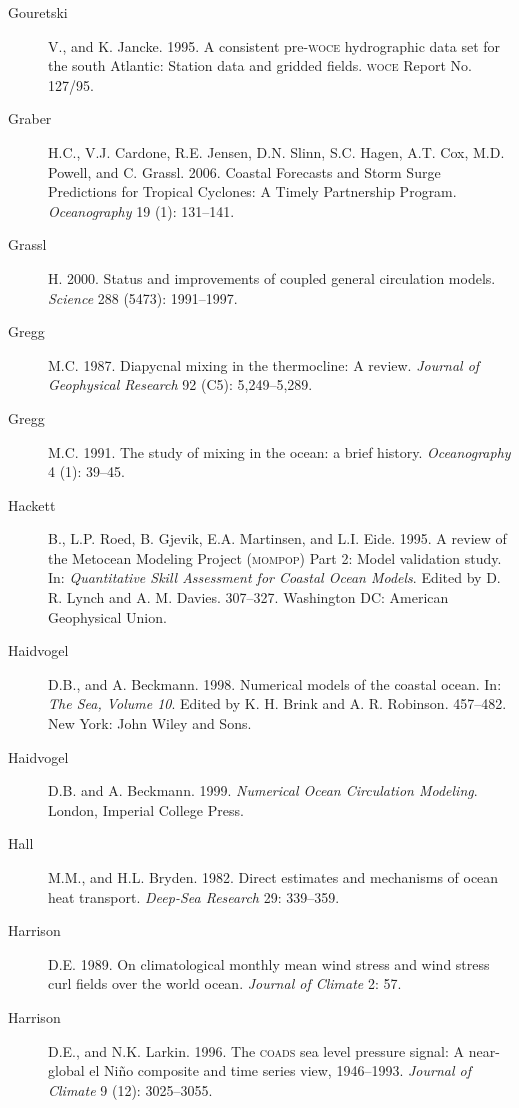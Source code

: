 \begin{description}
\item [Gouretski]V., and K. Jancke. 1995. A consistent pre-\textsc{woce}
hydrographic data set for the south Atlantic: Station data and gridded fields.
\textsc{woce} Report No. 127/95.

\item [Graber]H.C., V.J. Cardone, R.E. Jensen, D.N. Slinn, S.C. Hagen, A.T. Cox, M.D. Powell, and 
C. Grassl. 2006. Coastal Forecasts and Storm Surge Predictions for Tropical Cyclones: A Timely Partnership Program. \textit{Oceanography} 19 (1): 131--141.
	
\item [Grassl]H. 2000. Status and improvements of coupled general circulation
models. \textit{Science} 288 (5473): 1991--1997.

\item[Gregg]M.C. 1987. Diapycnal mixing in the thermocline: A review.
\textit{Journal of Geophysical Research} 92 (C5): 5,249--5,289.

\item [Gregg]M.C. 1991. The study of mixing in the ocean: a brief history.
\textit{Oceanography} 4 (1): 39--45.

\item [Hackett]B., L.P. Roed, B. Gjevik, E.A. Martinsen, and L.I. Eide. 1995. A
review of the Metocean Modeling Project (\textsc{mompop}) Part 2: Model
validation study. In: \textit{Quantitative Skill Assessment for Coastal Ocean
Models}. Edited by D. R. Lynch and A. M. Davies. 307--327. Washington DC:
American Geophysical Union.

\item [Haidvogel]D.B., and A. Beckmann. 1998. Numerical models of the coastal ocean. In: \textit{The Sea, Volume 10}. Edited by K. H. Brink and A. R. Robinson. 457--482. New York: John Wiley and Sons.

\item [Haidvogel]D.B. and A. Beckmann. 1999. \textit{Numerical Ocean Circulation
Modeling}. London, Imperial College Press.

\item [Hall]M.M., and H.L. Bryden. 1982. Direct
estimates and mechanisms of ocean heat transport. \textit{Deep-Sea Research} 29:
339--359.

\item [Harrison]D.E. 1989. On climatological monthly mean wind stress and wind
stress curl fields over the world ocean. \textit{Journal of Climate} 2: 57.

\item [Harrison]D.E., and N.K. Larkin. 1996. The \textsc{coads} sea level pressure
signal: A near-global el Ni\~{n}o composite and time series view, 1946--1993.
\textit{Journal of Climate} 9 (12): 3025--3055.


\end{description}

